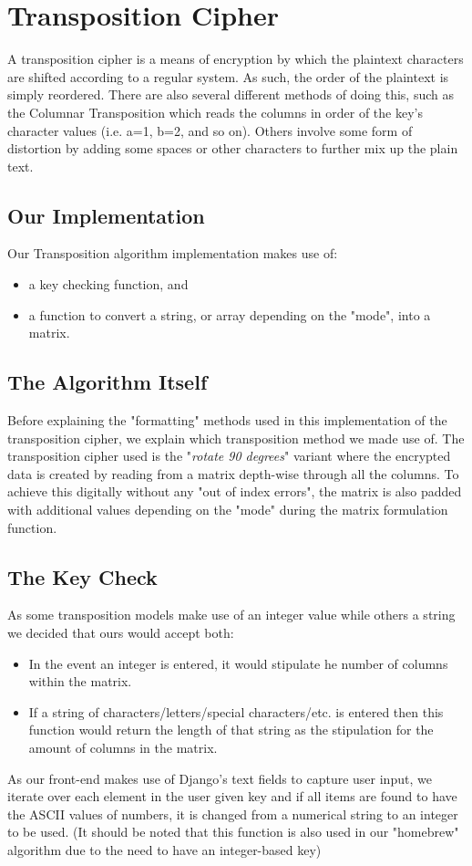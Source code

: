 \documentclass[a4paper, 12pt, titlepage]{report}
\begin{document}
\section{Transposition Cipher}
A transposition cipher is a means of encryption by which the plaintext characters are shifted according to a regular system. As such, the order of the plaintext is simply reordered. There are also several different methods of doing this, such as the Columnar Transposition which reads the columns in order of the key's character values (i.e. a=1, b=2, and so on). Others involve some form of distortion by adding some spaces or other characters to further mix up the plain text.
\subsection{Our Implementation}
Our Transposition algorithm implementation makes use of:
\begin{itemize}
\item a key checking function, and
\item a function to convert a string, or array depending on the "mode", into a matrix.
\end{itemize}
\subsection{The Algorithm Itself}
Before explaining the "formatting" methods used in this implementation of the transposition cipher, we explain which transposition method we made use of. The transposition cipher used is the "\textsl{rotate 90 degrees}" variant where the encrypted data is created by reading from a matrix depth-wise through all the columns. To achieve this digitally without any "out of index errors", the matrix is also padded with additional values depending on the "mode" during the matrix formulation function.
\subsection{The Key Check}
As some transposition models make use of an integer value while others a string we decided that ours would accept both:
\begin{itemize}
\item In the event an integer is entered, it would stipulate he number of columns within the matrix.
\item If a string of characters/letters/special characters/etc. is entered then this function would return the length of that string as the stipulation for the amount of columns in the matrix.
\end{itemize}
As our front-end makes use of Django's text fields to capture user input, we iterate over each element in the user given key and if all items are found to have the ASCII values of numbers, it is changed from a numerical string to an integer to be used.
(It should be noted that this function is also used in our "homebrew" algorithm due to the need to have an integer-based key)
\end{document}
